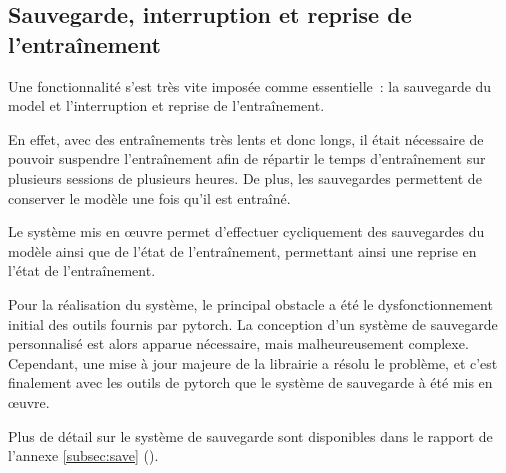 \subsection{Sauvegarde, interruption et reprise de l'entraînement}\label{subsec:gmsnn_save}
Une fonctionnalité s'est très vite imposée comme essentielle~: la sauvegarde du \gls{model} et l'interruption et reprise de l'entraînement.

En effet, avec des entraînements très lents et donc longs, il était nécessaire de pouvoir suspendre l'entraînement afin de répartir le temps d'entraînement sur plusieurs sessions de plusieurs heures. De plus, les sauvegardes permettent de conserver le modèle une fois qu'il est entraîné.

Le système mis en œuvre permet d'effectuer cycliquement des sauvegardes du modèle ainsi que de l'état de l'entraînement, permettant ainsi une reprise en l'état de l'entraînement.

Pour la réalisation du système, le principal obstacle a été le dysfonctionnement initial des outils fournis par \gls{pytorch}.
La conception d'un système de sauvegarde personnalisé est alors apparue nécessaire, mais malheureusement complexe.
Cependant, une mise à jour majeure de la librairie a résolu le problème, et c'est finalement avec les outils de \gls{pytorch} que le système de sauvegarde à été mis en œuvre.

Plus de détail sur le système de sauvegarde sont disponibles dans le rapport de l'annexe \ref{subsec:save} ().